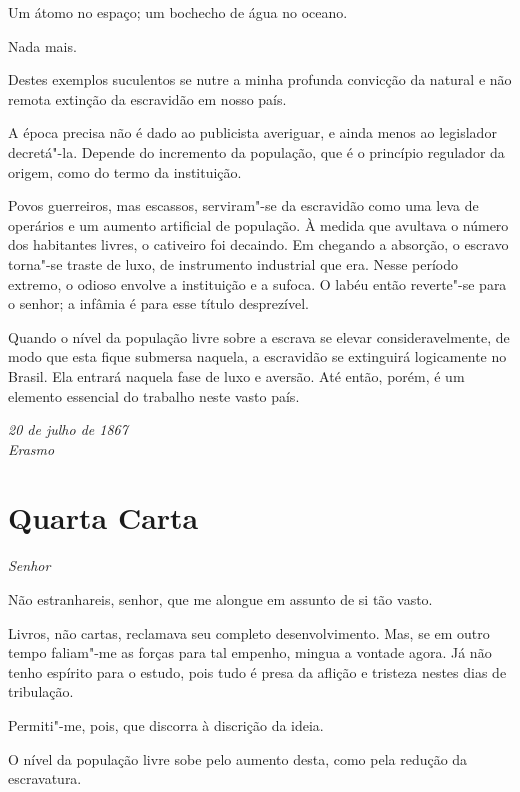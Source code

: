 Um átomo no espaço; um bochecho de água no oceano. 

Nada mais.

Destes exemplos suculentos se nutre a minha profunda convicção da
natural e não remota extinção da escravidão em nosso país.

A época precisa não é dado ao publicista averiguar, e ainda menos ao
legislador decretá"-la. Depende do incremento da população, que é o
princípio regulador da origem, como do termo da instituição.

Povos guerreiros, mas escassos, serviram"-se da escravidão como uma
leva de operários e um aumento artificial de população. À medida que
avultava o número dos habitantes livres, o cativeiro foi decaindo. Em
chegando a absorção, o escravo torna"-se traste de luxo, de
instrumento industrial que era. Nesse período extremo, o odioso envolve
a instituição e a sufoca. O labéu então reverte"-se para o senhor; a
infâmia é para esse título desprezível.

Quando o nível da população livre sobre a escrava se elevar 		
consideravelmente, de modo que esta fique submersa naquela, a
escravidão se extinguirá logicamente no Brasil. Ela entrará naquela
fase de luxo e aversão. Até então, porém, é um elemento essencial do
trabalho neste vasto país.

\begin{flushright}
\textit{20 de julho de 1867\\ 
Erasmo}
\end{flushright}

\chapter[Quarta Carta]{Quarta Carta }

\noindent\textit{Senhor}

\setcounter{@sectionNumCenter}{0}

\sectionitem

Não estranhareis, senhor, que me alongue em assunto de si tão vasto.

 Livros, não cartas, reclamava seu completo desenvolvimento. Mas, se em
outro tempo faliam"-me as forças para tal empenho, mingua a vontade
agora. Já não tenho espírito para o estudo, pois tudo é presa da
aflição e tristeza nestes dias de tribulação. 

 Permiti"-me, pois, que discorra à discrição da ideia. 

 O nível da população livre sobe pelo aumento desta, como pela redução
da escravatura.

